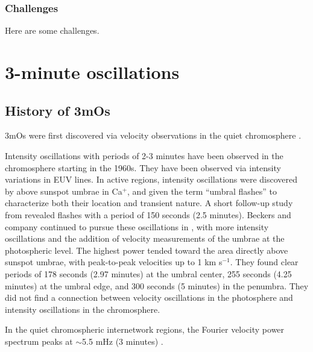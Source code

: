 

\subsubsection{Challenges}

Here are some challenges.




\clearpage
\section{3-minute oscillations}



\subsection{History of 3mOs}


3mOs were
first discovered via velocity observations in the quiet chromosphere
\citep{Jensen1963}.

Intensity oscillations with periods of 2-3 minutes have been observed in
the chromosphere starting in the 1960s.
They have been observed
via intensity variations in EUV lines.
In active regions, intensity oscillations were discovered by
\cite{Beckers1969} above sunspot umbrae in Ca$^{+}$,
and given the term ``umbral flashes'' to characterize
both their location and transient nature.
A short follow-up study from \cite{Wittmann1969} revealed
flashes with a period of 150 seconds (2.5 minutes).
Beckers and company continued to pursue these oscillations in
\citep{Beckers1972},
with more intensity oscillations and the addition of velocity measurements
of the umbrae at the photospheric level.
The highest power tended toward the area
directly above sunspot umbrae, with peak-to-peak velocities up to
1 km s$^{-1}$.
They found clear periods of
178 seconds (2.97 minutes) at the umbral center,
255 seconds (4.25 minutes) at the umbral edge, and
300 seconds (5 minutes) in the penumbra.
They did not find a connection between velocity oscillations in the photosphere
and intensity oscillations in the chromosphere.

In the quiet chromospheric internetwork regions,
the Fourier velocity power spectrum peaks at
$\sim$5.5 mHz (3 minutes)
\citep{Orrall1966}.

